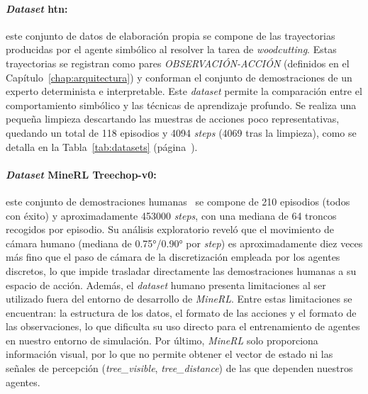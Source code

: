 \paragraph{\textit{Dataset} \gls{htn}:} este conjunto de datos de elaboración propia se compone de las 
trayectorias producidas por el agente simbólico al resolver la tarea de
\textit{woodcutting}. Estas trayectorias se registran como pares \textit{OBSERVACIÓN-ACCIÓN} 
(definidos en el Capítulo~\ref{chap:arquitectura}) y conforman el
conjunto de demostraciones de un experto determinista e interpretable. Este
\textit{dataset} permite la comparación entre el comportamiento simbólico y las
técnicas de aprendizaje profundo. Se realiza una pequeña limpieza descartando las 
muestras de acciones poco representativas, quedando un total de \num{118} episodios y
\num{4094} \textit{steps} (\num{4069} tras la limpieza), como se detalla en la Tabla~\ref{tab:datasets} (página~\pageref{tab:datasets}).

\paragraph{\textit{Dataset} MineRL Treechop-v0:} este conjunto de demostraciones humanas~\cite{guss2019minerl}
se compone de \num{210} episodios (todos con éxito) y aproximadamente \num{453000}
\textit{steps}, con una mediana de \num{64} troncos recogidos por episodio.
Su análisis exploratorio reveló que el movimiento de cámara humano (mediana de
\ang{0.75}/\ang{0.90} por \textit{step}) es aproximadamente diez veces
más fino que el paso de cámara de la discretización empleada por los agentes discretos, lo que impide trasladar
directamente las demostraciones humanas a su espacio de acción. Además, el \textit{dataset} humano
presenta limitaciones al ser utilizado fuera del entorno de desarrollo de \textit{MineRL}.
Entre estas limitaciones se encuentran: la estructura de los datos, el formato de las acciones y 
el formato de las observaciones, lo que dificulta su uso directo para el
entrenamiento de agentes en nuestro entorno de simulación. Por último, \textit{MineRL} solo proporciona información
visual, por lo que no permite obtener el vector de estado ni las señales de percepción
(\textit{tree\_visible}, \textit{tree\_distance}) de las que dependen nuestros agentes. 

